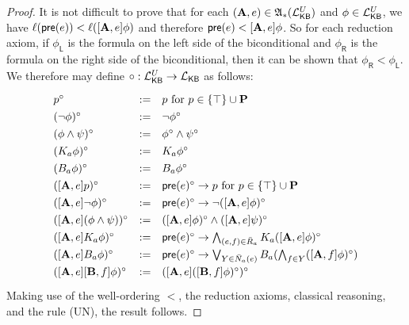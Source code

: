 \documentclass[12pt]{article}
\theoremstyle{definition}
\newcommand{\Prop}{{\bf P}}    %
\newcommand{\Lang}{{\cal L}}   %
\newcommand{\pre}{\mathsf{pre}}
\newcommand{\A}{{\bf A}}
\newcommand{\B}{{\bf B}}
\newcommand{\Actm}{\mathfrak{A}}   %
\newcommand{\KB}{{\mathsf{KB}}}                        %
\begin{document}
\begin{proof}
  It is not difficult to prove that for each
  $(\A,e)\in\Actm_*(\Lang_\KB^U)$ and $\phi\in\Lang_\KB^U$, we have
  $\ell(\pre(e))<\ell([\A,e]\phi)$ and therefore $\pre(e)<[\A,e]\phi$.
  So for each reduction axiom, if $\phi_{\mathsf{L}}$ is the formula
  on the left side of the biconditional and $\phi_{\mathsf{R}}$ is the
  formula on the right side of the biconditional, then it can be shown
  that $\phi_{\mathsf{R}}<\phi_{\mathsf{L}}$.  We therefore may define
  $\circ:\Lang_\KB^U\to\Lang_\KB$ as follows:
  \[
  \renewcommand{\arraystretch}{1.3}
  \begin{array}[t]{lcl}
    p^\circ &:=& p \text{ for } p\in\{\top\}\cup\Prop \\
    (\lnot\phi)^\circ &:=& \lnot\phi^\circ \\
    (\phi\land\psi)^\circ &:=& \phi^\circ\land\psi^\circ \\
    (K_a\phi)^\circ &:=& K_a\phi^\circ \\
    (B_a\phi)^\circ &:=& B_a\phi^\circ \\
    ([\A,e]p)^\circ &:=& 
    \textstyle
    \pre(e)^\circ\to p \text{ for }  p\in\{\top\}\cup\Prop 
    \\
    ([\A,e]\lnot\phi)^\circ &:=& 
    \pre(e)^\circ\to \lnot([\A,e]\phi)^\circ
    \\
    ([\A,e](\phi\land\psi))^\circ &:=&
    ([\A,e]\phi)^\circ\land([\A,e]\psi)^\circ
    \\
    ([\A,e]K_a\phi)^\circ &:=& 
    \textstyle
    \pre(e)^\circ\to \bigwedge_{(e,f)\in\bar{R}_a}K_a([\A,e]\phi)^\circ
    \\
    ([\A,e]B_a\phi)^\circ &:=& 
    \textstyle
    \pre(e)^\circ\to
    \bigvee_{Y\in\bar{N}_a(e)} B_a(\bigwedge_{f\in Y}([\A,f]\phi)^\circ)
    \\
    ([\A,e][\B,f]\phi)^\circ &:=&
    ([\A,e]([\B,f]\phi)^\circ)^\circ
  \end{array}
  \renewcommand{\arraystretch}{1.0}
  \]
  Making use of the well-ordering $<$, the reduction axioms,
  classical reasoning, and the rule (UN), the result follows.
\end{proof}
\end{document}
